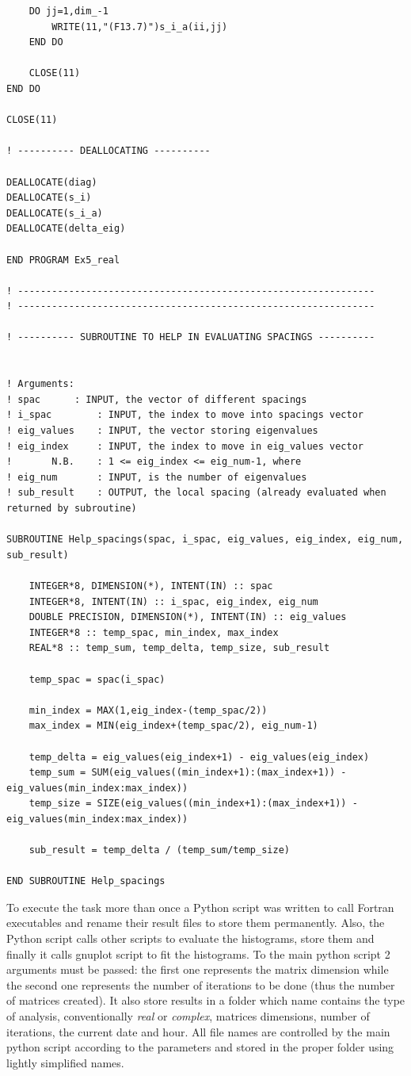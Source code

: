 \documentclass[12pt, a4paper, notitlepage]{report}
\begin{document}
\begin{lstlisting}
	DO jj=1,dim_-1
		WRITE(11,"(F13.7)")s_i_a(ii,jj)
	END DO
	
	CLOSE(11)
END DO

CLOSE(11)

! ---------- DEALLOCATING ----------

DEALLOCATE(diag)
DEALLOCATE(s_i)
DEALLOCATE(s_i_a)
DEALLOCATE(delta_eig)

END PROGRAM Ex5_real

! ---------------------------------------------------------------
! ---------------------------------------------------------------

! ---------- SUBROUTINE TO HELP IN EVALUATING SPACINGS ----------


! Arguments:
! spac		: INPUT, the vector of different spacings
! i_spac		: INPUT, the index to move into spacings vector
! eig_values	: INPUT, the vector storing eigenvalues
! eig_index		: INPUT, the index to move in eig_values vector
!		N.B.	: 1 <= eig_index <= eig_num-1, where
! eig_num 		: INPUT, is the number of eigenvalues
! sub_result	: OUTPUT, the local spacing (already evaluated when returned by subroutine)

SUBROUTINE Help_spacings(spac, i_spac, eig_values, eig_index, eig_num, sub_result)
	
	INTEGER*8, DIMENSION(*), INTENT(IN) :: spac
	INTEGER*8, INTENT(IN) :: i_spac, eig_index, eig_num
	DOUBLE PRECISION, DIMENSION(*), INTENT(IN) :: eig_values
	INTEGER*8 :: temp_spac, min_index, max_index
	REAL*8 :: temp_sum, temp_delta, temp_size, sub_result
	
	temp_spac = spac(i_spac)
	
	min_index = MAX(1,eig_index-(temp_spac/2))
	max_index = MIN(eig_index+(temp_spac/2), eig_num-1)
	
	temp_delta = eig_values(eig_index+1) - eig_values(eig_index)
	temp_sum = SUM(eig_values((min_index+1):(max_index+1)) - eig_values(min_index:max_index))
	temp_size = SIZE(eig_values((min_index+1):(max_index+1)) - eig_values(min_index:max_index))
	
	sub_result = temp_delta / (temp_sum/temp_size)

END SUBROUTINE Help_spacings
\end{lstlisting}

\vspace{0.5cm}

To execute the task more than once a Python script was written to call Fortran executables and rename their result files to store them permanently. Also, the Python script calls other scripts to evaluate the histograms, store them and finally it calls gnuplot script to fit the histograms. To the main python script 2 arguments must be passed: the first one represents the matrix dimension while the second one represents the number of iterations to be done (thus the number of matrices created). It also store results in a folder which name contains the type of analysis, conventionally \textit{real} or \textit{complex}, matrices dimensions, number of iterations, the current date and hour. All file names are controlled by the main python script according to the parameters and stored in the proper folder using lightly simplified names.\\
\end{document}
